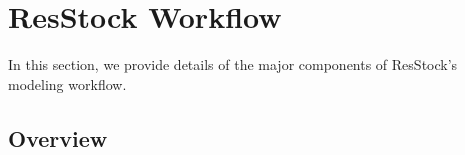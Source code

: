 \chapter{ResStock Workflow} \label{sec:workflow}
In this section, we provide details of the major components of ResStock's modeling workflow.

\section{Overview} 

